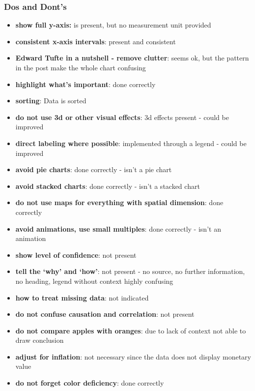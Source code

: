 \documentclass[a4paper]{article}
\begin{document}
    \subsubsection{Dos and Dont's}
    \begin{itemize}
        \item \textbf{show full y-axis:} is present, but no measurement unit provided
        \item \textbf{consistent x-axis intervals}: present and consistent
        \item \textbf{Edward Tufte in a nutshell - remove clutter}: seems ok, but the pattern in the post make the
        whole chart confusing
        \item \textbf{highlight what’s important}: done correctly
        \item \textbf{sorting}: Data is sorted
        \item \textbf{do not use 3d or other visual effects}: 3d effects present - could be improved
        \item \textbf{direct labeling where possible}: implemented through a legend - could be improved
        \item \textbf{avoid pie charts}: done correctly - isn't a pie chart
        \item \textbf{avoid stacked charts}: done correctly - isn't a stacked chart
        \item \textbf{do not use maps for everything with spatial dimension}: done correctly
        \item \textbf{avoid animations, use small multiples}: done correctly - isn't an animation
        \item \textbf{show level of confidence}: not present
        \item \textbf{tell the ‘why’ and ‘how’}: not present - no source, no further information, no heading,
        legend without context highly confusing
        \item \textbf{how to treat missing data}: not indicated
        \item \textbf{do not confuse causation and correlation}: not present
        \item \textbf{do not compare apples with oranges}: due to lack of context not able to draw conclusion
        \item \textbf{adjust for inflation}: not necessary since the data does not display monetary value
        \item \textbf{do not forget color deficiency}: done correctly
    \end{itemize}
\end{document}
